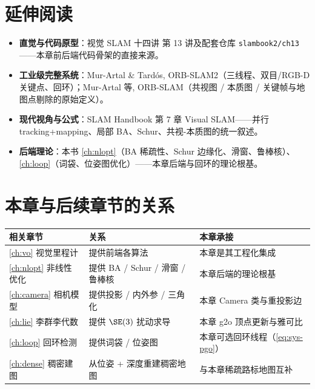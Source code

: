\section*{延伸阅读}
\begin{itemize}
  \item \textbf{直觉与代码原型}：视觉 SLAM 十四讲\cite{gaoxiang2019slam14} 第 13 讲及配套仓库 \texttt{slambook2/ch13}——本章前后端代码骨架的直接来源。
  \item \textbf{工业级完整系统}：Mur-Artal \& Tardós, ORB-SLAM2\cite{murartal2017orbslam2}（三线程、双目/RGB-D 关键点、回环）；Mur-Artal 等, ORB-SLAM\cite{murartal2015orbslam}（共视图 / 本质图 / 关键帧与地图点剔除的原始定义）。
  \item \textbf{现代视角与公式}：SLAM Handbook\cite{carlone2026handbook} 第 7 章 Visual SLAM——并行 tracking+mapping、局部 BA、Schur、共视-本质图的统一叙述。
  \item \textbf{后端理论}：本书 \cref{ch:nlopt}（BA 稀疏性、Schur 边缘化、滑窗、鲁棒核）、\cref{ch:loop}（词袋、位姿图优化）——本章后端与回环的理论根基。
\end{itemize}

\section*{本章与后续章节的关系}
\begin{table}[H]\centering\small
\begin{tabular}{lll}
\toprule
相关章节 & 关系 & 本章承接 \\
\midrule
\cref{ch:vo} 视觉里程计 & 提供前端各算法 & 本章是其工程化集成 \\
\cref{ch:nlopt} 非线性优化 & 提供 BA / Schur / 滑窗 / 鲁棒核 & 本章后端的理论根基 \\
\cref{ch:camera} 相机模型 & 提供投影 / 内外参 / 三角化 & 本章 Camera 类与重投影边 \\
\cref{ch:lie} 李群李代数 & 提供 $\SE(3)$ 扰动求导 & 本章 g2o 顶点更新与雅可比 \\
\cref{ch:loop} 回环检测 & 提供词袋 / 位姿图 & 本章可选回环线程（\cref{eq:sys-pgo}） \\
\cref{ch:dense} 稠密建图 & 从位姿 + 深度重建稠密地图 & 与本章稀疏路标地图互补 \\
\bottomrule
\end{tabular}
\end{table}

